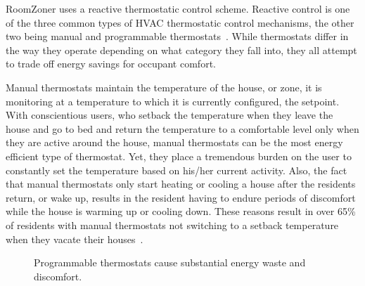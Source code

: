 RoomZoner uses a reactive thermostatic control scheme. Reactive control is one
of the three common types of HVAC thermostatic control mechanisms, the other two
being manual and programmable thermostats~\cite{thermostatHistory}. While
thermostats differ in the way they operate depending on what category they fall
into, they all attempt to trade off energy savings for occupant comfort.

Manual thermostats maintain the temperature of the house, or zone, it is
monitoring at a temperature to which it is currently configured, the
setpoint. With conscientious users, who setback the temperature when they leave
the house and go to bed and return the temperature to a comfortable level only
when they are active around the house, manual thermostats can be the most energy
efficient type of thermostat. Yet, they place a tremendous burden on the user to
constantly set the temperature based on his/her current activity. Also, the fact
that manual thermostats only start heating or cooling a house after the
residents return, or wake up, results in the resident having to endure periods
of discomfort while the house is warming up or cooling down. These reasons
result in over 65\% of residents with manual thermostats not switching to a
setback temperature when they vacate their houses~\cite{manualSetback}.

\begin{figure}[t]
 \caption[Drawbacks of Programmable Thermostats]{Programmable thermostats cause substantial energy waste and
  discomfort.} 
\label{fig:overviewScheduled}
\end{figure}
  
